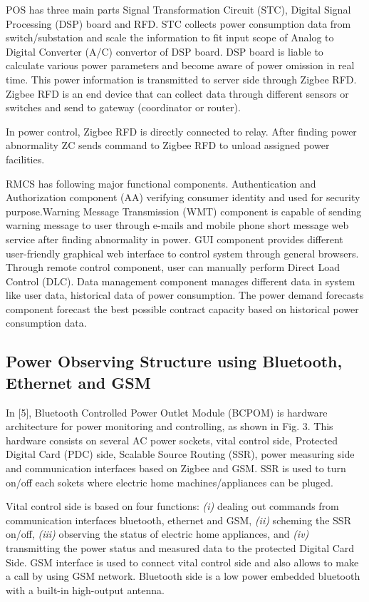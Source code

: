 \documentclass[10pt, conference, compsocconf]{IEEEtran}
\begin{document}
POS has three main parts Signal Transformation Circuit (STC), Digital Signal Processing (DSP) board and RFD. STC collects power consumption data from switch/substation and scale the information to fit input scope of Analog to Digital Converter (A/C) convertor of DSP board. DSP board is liable to calculate various power parameters and become aware of power omission in real time. This power information is transmitted to server side through Zigbee RFD. Zigbee RFD is an end device that can collect data through different sensors or switches and send to gateway (coordinator or router).

In power control, Zigbee RFD is directly connected to relay. After finding power abnormality ZC sends command to Zigbee RFD to unload assigned power facilities.

RMCS has following major functional components. Authentication and Authorization component (AA) verifying consumer identity and used for security purpose.Warning Message Transmission (WMT) component is capable of sending warning message to user through e-mails and mobile phone short message web service after finding abnormality in power. GUI component provides different user-friendly graphical web interface to control system through general browsers. Through remote control component, user can manually perform Direct Load Control (DLC). Data management component manages different data in system like user data, historical data of power consumption. The power demand forecasts component forecast the best possible contract capacity based on historical power consumption data.

\subsection{Power Observing Structure using Bluetooth, Ethernet and GSM }
In [5], Bluetooth Controlled Power Outlet Module (BCPOM) is hardware architecture for power monitoring and controlling, as shown in Fig. 3. This hardware consists on several AC power sockets, vital control side, Protected Digital Card (PDC) side, Scalable Source Routing (SSR), power measuring side and  communication interfaces based on Zigbee and GSM. SSR is used to turn on/off each sokets where electric home machines/appliances can be pluged.

Vital control side is based on four functions: \textit{(i)} dealing out commands from communication interfaces bluetooth, ethernet and GSM, \textit{(ii)} scheming the SSR on/off, \textit{(iii)} observing the status of electric home appliances, and \textit{(iv)} transmitting the power status and measured data to the protected Digital Card Side. GSM interface is used to connect vital control side and also allows to make a call by using GSM network. Bluetooth side is a low power embedded bluetooth with a built-in high-output antenna.
\end{document}
